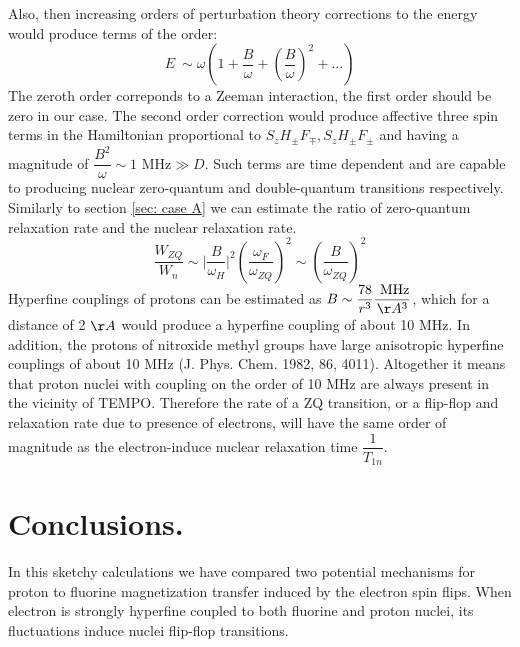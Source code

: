 \documentclass[a4paper, 12pt]{article}
\begin{document}
Also, then increasing orders of perturbation theory corrections to the energy would produce terms of the order:
\begin{equation}
E ~ \sim \omega (1 + \dfrac{B}{\omega} + (\dfrac{B}{\omega})^2 + ...)
\end{equation}
The zeroth order correponds to a Zeeman interaction, the first order should be zero in our case. The second order correction would produce affective three spin terms in the Hamiltonian proportional to $S_z H_{\pm}F_{\mp}, S_z H_{\pm}F_{\pm}$ and having a magnitude of $\dfrac{B^2}{\omega} \sim 1 \text{ MHz} \gg D$. Such terms are time dependent and are capable to producing nuclear zero-quantum and double-quantum transitions respectively.
Similarly to section \ref{sec: case A} we can estimate the ratio of zero-quantum relaxation rate and the nuclear relaxation rate. 
\begin{equation}
\dfrac{W_{ZQ}}{W_n} \sim \vert \dfrac{B}{\omega_H} \vert^2 (\dfrac{\omega_F}{\omega_{ZQ}})^2 \sim (\dfrac{B}{\omega_{ZQ}})^2
\end{equation}
Hyperfine couplings of protons can be estimated as $B \sim \dfrac{78}{r^3} \dfrac{\text{ MHz} }{ \AA^3}  $, which for a distance of 2 $\AA$ would produce  a hyperfine coupling of about 10 MHz. In addition, the protons of nitroxide methyl groups have large anisotropic hyperfine couplings of about 10 MHz (J. Phys. Chem. 1982, 86, 4011). Altogether it means that proton nuclei with coupling on the order of  10 MHz are always present in the vicinity of TEMPO. Therefore the rate of a ZQ transition, or a flip-flop and relaxation rate due to presence of electrons,  will have the same order of magnitude as the electron-induce nuclear relaxation time $\dfrac{1}{T_{1n}}$.

\section{Conclusions.}
In this sketchy calculations we have compared two potential mechanisms for proton to fluorine magnetization transfer induced by the electron spin flips. When electron is strongly hyperfine coupled to both fluorine and proton nuclei, its fluctuations induce nuclei flip-flop transitions.
\end{document}
